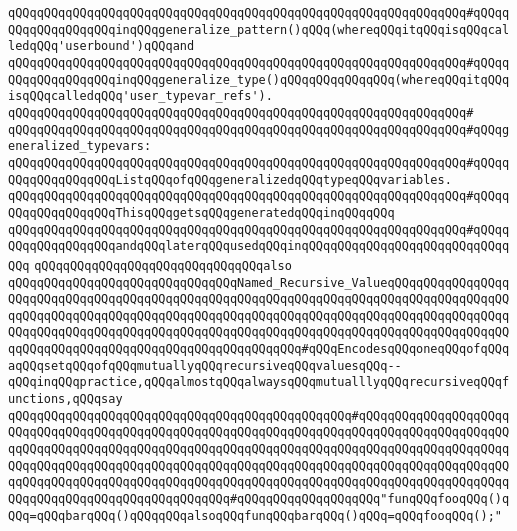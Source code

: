 \verb|qQQqqQQqqQQqqQQqqQQqqQQqqQQqqQQqqQQqqQQqqQQqqQQqqQQqqQQqqQQqqQQq#qQQqqQQqqQQqqQQqqQQqinqQQqgeneralize_pattern()qQQq(whereqQQqitqQQqisqQQqcalledqQQq'userbound')qQQqand|\newline
\verb|qQQqqQQqqQQqqQQqqQQqqQQqqQQqqQQqqQQqqQQqqQQqqQQqqQQqqQQqqQQqqQQq#qQQqqQQqqQQqqQQqqQQqinqQQqgeneralize_type()qQQqqQQqqQQqqQQq(whereqQQqitqQQqisqQQqcalledqQQq'user_typevar_refs').|\newline
\verb|qQQqqQQqqQQqqQQqqQQqqQQqqQQqqQQqqQQqqQQqqQQqqQQqqQQqqQQqqQQqqQQq#|\newline
\verb|qQQqqQQqqQQqqQQqqQQqqQQqqQQqqQQqqQQqqQQqqQQqqQQqqQQqqQQqqQQqqQQq#qQQqgeneralized_typevars:|\newline
\verb|qQQqqQQqqQQqqQQqqQQqqQQqqQQqqQQqqQQqqQQqqQQqqQQqqQQqqQQqqQQqqQQq#qQQqqQQqqQQqqQQqqQQqListqQQqofqQQqgeneralizedqQQqtypeqQQqvariables.|\newline
\verb|qQQqqQQqqQQqqQQqqQQqqQQqqQQqqQQqqQQqqQQqqQQqqQQqqQQqqQQqqQQqqQQq#qQQqqQQqqQQqqQQqqQQqThisqQQqgetsqQQqgeneratedqQQqinqQQqqQQq|\newline
\verb|qQQqqQQqqQQqqQQqqQQqqQQqqQQqqQQqqQQqqQQqqQQqqQQqqQQqqQQqqQQqqQQq#qQQqqQQqqQQqqQQqqQQqandqQQqlaterqQQqusedqQQqinqQQqqQQqqQQqqQQqqQQqqQQqqQQq|\verb|qQQq|\newline
\newline
\newline
\verb|qQQqqQQqqQQqqQQqqQQqqQQqqQQqqQQqalso|\newline
\verb|qQQqqQQqqQQqqQQqqQQqqQQqqQQqqQQqNamed_Recursive_ValueqQQqqQQqqQQqqQQqqQQqqQQqqQQqqQQqqQQqqQQqqQQqqQQqqQQqqQQqqQQqqQQqqQQqqQQqqQQqqQQqqQQqqQQqqQQqqQQqqQQqqQQqqQQqqQQqqQQqqQQqqQQqqQQqqQQqqQQqqQQqqQQqqQQqqQQqqQQqqQQqqQQqqQQqqQQqqQQqqQQqqQQqqQQqqQQqqQQqqQQqqQQqqQQqqQQqqQQqqQQqqQQqqQQqqQQqqQQqqQQqqQQqqQQqqQQqqQQqqQQqqQQqqQQq#qQQqEncodesqQQqoneqQQqofqQQqaqQQqsetqQQqofqQQqmutuallyqQQqrecursiveqQQqvaluesqQQq--qQQqinqQQqpractice,qQQqalmostqQQqalwaysqQQqmutualllyqQQqrecursiveqQQqfunctions,qQQqsay|\newline
\verb|qQQqqQQqqQQqqQQqqQQqqQQqqQQqqQQqqQQqqQQqqQQqqQQq#qQQqqQQqqQQqqQQqqQQqqQQqqQQqqQQqqQQqqQQqqQQqqQQqqQQqqQQqqQQqqQQqqQQqqQQqqQQqqQQqqQQqqQQqqQQqqQQqqQQqqQQqqQQqqQQqqQQqqQQqqQQqqQQqqQQqqQQqqQQqqQQqqQQqqQQqqQQqqQQqqQQqqQQqqQQqqQQqqQQqqQQqqQQqqQQqqQQqqQQqqQQqqQQqqQQqqQQqqQQqqQQqqQQqqQQqqQQqqQQqqQQqqQQqqQQqqQQqqQQqqQQqqQQqqQQqqQQqqQQqqQQqqQQqqQQqqQQqqQQqqQQqqQQqqQQqqQQqqQQqqQQqqQQqqQQq#qQQqqQQqqQQqqQQqqQQq"funqQQqfooqQQq()qQQq=qQQqbarqQQq()qQQqqQQqalsoqQQqfunqQQqbarqQQq()qQQq=qQQqfooqQQq();"|\newline
